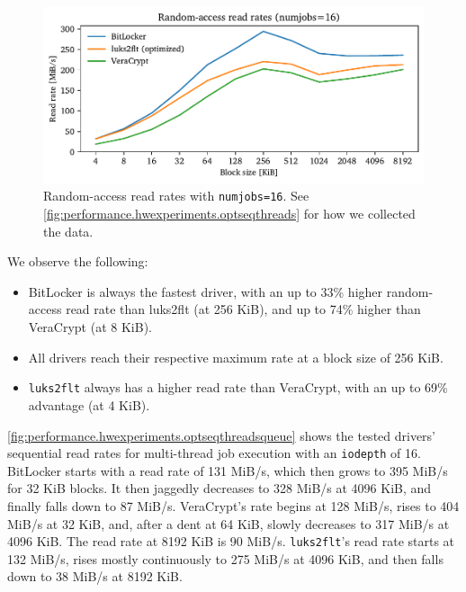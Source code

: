 \begin{figure}[htb!]
	\center
	\includegraphics[scale=1]{../fig/performance.hwexperiments.optrandthreads.pdf}
	\caption[
		Random-access read rates with \texttt{numjobs=16}
	]{
		Random-access read rates with \texttt{numjobs=16}. See \autoref{fig:performance.hwexperiments.optseqthreads} for how we collected the data.
	}
	\label{fig:performance.hwexperiments.optrandthreads}
\end{figure}

We observe the following:
\begin{itemize}[beginpenalty=10000]
	\item BitLocker is always the fastest driver, with an up to 33\% higher random-access read rate than luks2flt (at 256 KiB), and up to 74\% higher than VeraCrypt (at 8 KiB).
	\item All drivers reach their respective maximum rate at a block size of 256 KiB.
	\item \texttt{luks2flt} always has a higher read rate than VeraCrypt, with an up to 69\% advantage (at 4 KiB).
\end{itemize}

\autoref{fig:performance.hwexperiments.optseqthreadsqueue} shows the tested drivers' sequential read rates for multi-thread job execution with an \texttt{iodepth} of 16. BitLocker starts with a read rate of 131 MiB/s, which then grows to 395 MiB/s for 32 KiB blocks. It then jaggedly decreases to 328 MiB/s at 4096 KiB, and finally falls down to 87 MiB/s. VeraCrypt's rate begins at 128 MiB/s, rises to 404 MiB/s at 32 KiB, and, after a dent at 64 KiB, slowly decreases to 317 MiB/s at 4096 KiB. The read rate at 8192 KiB is 90 MiB/s. \texttt{luks2flt}'s read rate starts at 132 MiB/s, rises mostly continuously to 275 MiB/s at 4096 KiB, and then falls down to 38 MiB/s at 8192 KiB.

